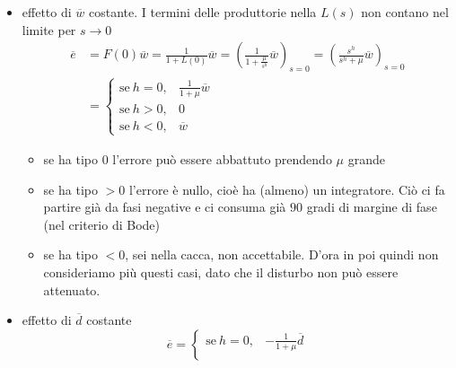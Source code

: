 \begin{itemize}
	\item effetto di $\overline{w}$ costante. I termini delle produttorie nella $L(s)$ non contano nel limite per $s\to 0$\begin{equation*}
	      \begin{aligned}
	      	\overline{e}      & =F(0)\overline{w} =\frac{1}{1+L(0)}\overline{w} =\left(\frac{1}{1+\frac{\mu }{s^h}}\overline{w}\right)_{s=0} =\left(\frac{s^h}{s^h +\mu }\overline{w}\right)_{s=0} \\
	      	                  & =\begin{cases}                                                                                                                                                     
	      	\text{se} \ h=0,  & \frac{1}{1+\mu }\overline{w}                                                                                                                                       \\
	      	\text{se} \ h >0, & 0                                                                                                                                                                  \\
	      	\text{se} \ h< 0, & \overline{w}                                                                                                                                                       
	      	\end{cases}
	      \end{aligned}
	\end{equation*}
	\begin{itemize}
		\item se ha tipo $0$ l'errore può essere abbattuto prendendo $\mu $ grande
		\item se ha tipo $ >0$ l'errore è nullo, cioè ha (almeno) un integratore. Ciò ci fa partire già da fasi negative e ci consuma già $90$ gradi di margine di fase (nel criterio di Bode)
		\item se ha tipo $< 0$, sei nella cacca, non accettabile. D'ora in poi quindi non consideriamo più questi casi, dato che il disturbo non può essere attenuato.
	\end{itemize}
	\item effetto di $\overline{d}$ costante\begin{equation*}
	      \overline{e} =\begin{cases}
	      \text{se} \ h=0, & -\frac{1}{1+\mu }\overline{d}\\

\end{cases}
\end{equation*}
\end{itemize}
